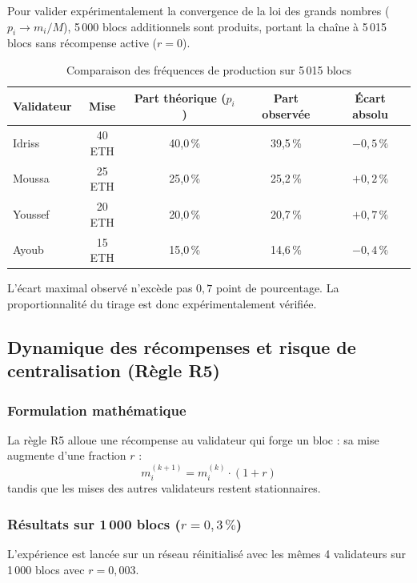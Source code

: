 \documentclass[11pt,a4paper]{article}
\begin{document}
Pour valider expérimentalement la convergence de la loi des grands nombres ($p_i \to m_i/M$), 5\,000 blocs additionnels sont produits, portant la chaîne à 5\,015 blocs sans récompense active ($r = 0$).

\begin{table}[H]
\centering
\begin{tabular}{@{}lcccc@{}}
\toprule
\textbf{Validateur} & \textbf{Mise} & \textbf{Part théorique ($p_i$)} & \textbf{Part observée} & \textbf{Écart absolu} \\
\midrule
Idriss  & 40 ETH & 40,0\,\% & 39,5\,\% & $-0{,}5\,\%$ \\
Moussa  & 25 ETH & 25,0\,\% & 25,2\,\% & $+0{,}2\,\%$ \\
Youssef & 20 ETH & 20,0\,\% & 20,7\,\% & $+0{,}7\,\%$ \\
Ayoub   & 15 ETH & 15,0\,\% & 14,6\,\% & $-0{,}4\,\%$ \\
\bottomrule
\end{tabular}
\caption{Comparaison des fréquences de production sur 5\,015 blocs}
\label{tab:5000_blocs}
\end{table}

L'écart maximal observé n'excède pas $0{,}7$ point de pourcentage. La proportionnalité du tirage est donc expérimentalement vérifiée.

\subsection{Dynamique des récompenses et risque de centralisation (Règle R5)}

\subsubsection*{Formulation mathématique}
La règle R5 alloue une récompense au validateur qui forge un bloc : sa mise augmente d'une fraction $r$ :
\[
m_i^{(k+1)} = m_i^{(k)} \cdot (1 + r)
\]
tandis que les mises des autres validateurs restent stationnaires.

\subsubsection*{Résultats sur 1\,000 blocs ($r = 0{,}3\,\%$)}
L'expérience est lancée sur un réseau réinitialisé avec les mêmes 4 validateurs sur 1\,000 blocs avec $r = 0{,}003$.
\end{document}
